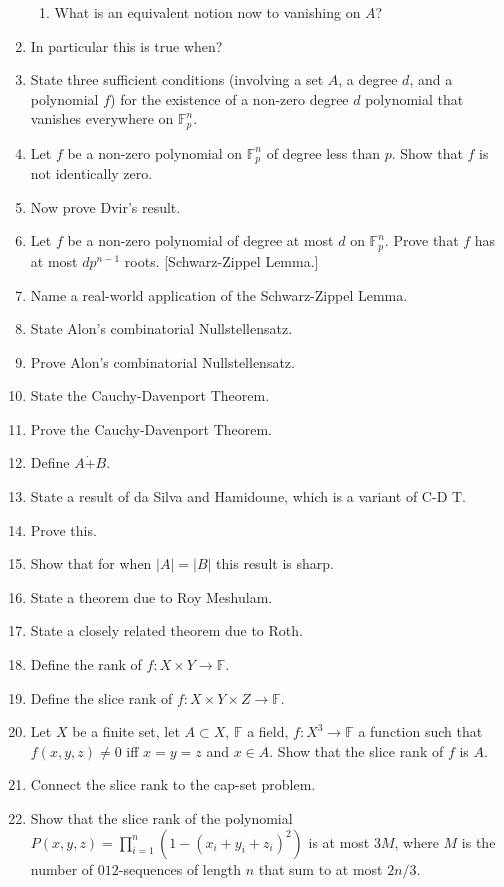 \documentclass[10pt]{article}
\newcommand{\bb}[1]{\mathbb{#1}}
\newcommand{\ra}{\to}
\begin{document}
\begin{enumerate}
\begin{enumerate}
        \item What is an equivalent notion now to vanishing on $A$?
    \end{enumerate}
    \item In particular this is true when?
    \item State three sufficient conditions (involving a set $A$, a degree $d$, and a polynomial $f$) for the existence of a non-zero degree $d$ polynomial that vanishes everywhere on $\bb{F}_p^n$.
    \item Let $f$ be a non-zero polynomial on $\bb{F}_p^n$ of degree less than $p$. Show that $f$ is not identically zero.
    \item Now prove Dvir's result.
    \item Let $f$ be a non-zero polynomial of degree at most $d$ on $\bb{F}_p^n$. Prove that $f$ has at most $dp^{n-1}$ roots. [Schwarz-Zippel Lemma.]
    \item Name a real-world application of the Schwarz-Zippel Lemma.
    \item State Alon's combinatorial Nullstellensatz.
    \item Prove Alon's combinatorial Nullstellensatz.
    \item State the Cauchy-Davenport Theorem.
    \item Prove the Cauchy-Davenport Theorem.
    \item Define $A\dot{+}B$.
    \item State a result of da Silva and Hamidoune, which is a variant of C-D T.
    \item Prove this.
    \item Show that for when $|A| =|B|$ this result is sharp.
    \item State a theorem due to Roy Meshulam.
    \item State a closely related theorem due to Roth.
    \item Define the rank of $f:X\times Y \ra \bb{F}$.
    \item Define the slice rank of $f : X\times Y\times Z \ra \bb{F}$.
    \item Let $X$ be a finite set, let $A\subset X$, $\bb{F}$ a field, $f:X^3 \ra \bb{F}$ a function such that $f(x,y,z)\ne 0$ iff $x = y = z$ and $x \in A$. Show that the slice rank of $f$ is $A$.
    \item Connect the slice rank to the cap-set problem.
    \item Show that the slice rank of the polynomial $P(x,y,z) = \prod_{i=1}^{n}(1-(x_i+y_i+z_i)^2)$ is at most $3M$, where $M$ is the number of $012$-sequences of length $n$ that sum to at most $2n/3$.

\end{enumerate}
\end{document}
